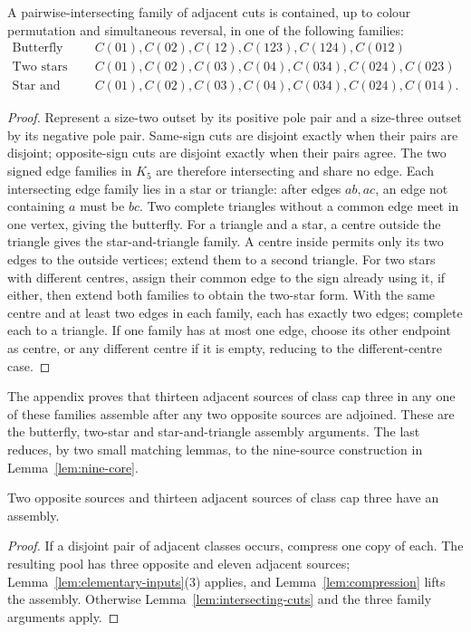\begin{lemma}\label{lem:intersecting-cuts}
A pairwise-intersecting family of adjacent cuts is contained, up to colour
permutation and simultaneous reversal, in one of the following families:
\[
\begin{array}{c|l}
\text{Butterfly}&C(01),C(02),C(12),C(123),C(124),C(012)\\
\text{Two stars}&C(01),C(02),C(03),C(04),C(034),C(024),C(023)\\
\text{Star and triangle}&C(01),C(02),C(03),C(04),C(034),C(024),C(014).
\end{array}
\]
\end{lemma}
\begin{proof}
Represent a size-two outset by its positive pole pair and a size-three
outset by its negative pole pair. Same-sign cuts are disjoint exactly
when their pairs are disjoint; opposite-sign cuts are disjoint exactly
when their pairs agree. The two signed edge families in $K_5$ are therefore
intersecting and share no edge. Each intersecting edge family lies in a
star or triangle: after edges $ab,ac$, an edge not containing $a$ must
be $bc$.
Two complete triangles without a common edge meet in one vertex, giving
the butterfly. For a triangle and a star, a centre outside the triangle
gives the star-and-triangle family. A centre inside permits only its two
edges to the outside vertices; extend them to a second triangle.
For two stars with different centres, assign their common edge to the
sign already using it, if either, then extend both families to obtain
the two-star form. With the same centre and at least two edges in each
family, each has exactly two edges; complete each to a triangle. If one
family has at most one edge, choose its other endpoint as centre, or any
different centre if it is empty, reducing to the different-centre case.
\end{proof}

The appendix proves that thirteen adjacent sources of class cap three in
any one of these families assemble after any two opposite sources are
adjoined. These are the butterfly, two-star and star-and-triangle assembly
arguments. The last reduces, by two small matching lemmas, to the
nine-source construction in Lemma~\ref{lem:nine-core}.

\begin{proposition}\label{prop:two-opposite-elementary}
Two opposite sources and thirteen adjacent sources of class cap three
have an assembly.
\end{proposition}
\begin{proof}
If a disjoint pair of adjacent classes occurs, compress one copy of each.
The resulting pool has three opposite and eleven adjacent sources;
Lemma~\ref{lem:elementary-inputs}(3) applies, and
Lemma~\ref{lem:compression} lifts the assembly. Otherwise
Lemma~\ref{lem:intersecting-cuts} and the three family arguments apply.
\end{proof}

